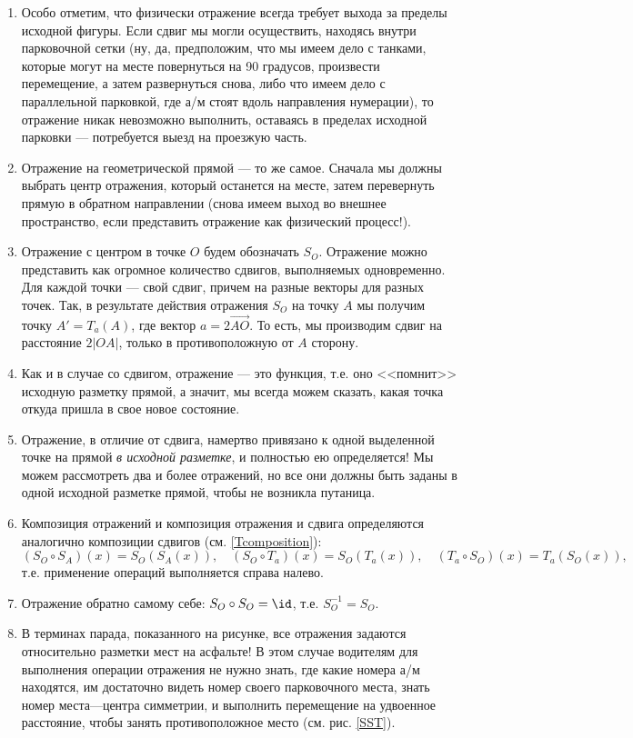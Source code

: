 \begin{enumerate}
\item Особо отметим, что физически отражение всегда требует выхода за пределы исходной фигуры. Если сдвиг мы могли осуществить, находясь внутри парковочной сетки (ну, да, предположим, что мы имеем дело с танками, которые могут на месте повернуться на 90 градусов, произвести перемещение, а затем развернуться снова, либо что имеем дело с параллельной парковкой, где а/м стоят вдоль направления нумерации), то отражение никак невозможно выполнить, оставаясь в пределах исходной парковки --- потребуется выезд на проезжую часть.
\item Отражение на геометрической прямой --- то же самое. Сначала мы должны выбрать центр отражения, который останется на месте, затем перевернуть прямую в обратном направлении (снова имеем выход во внешнее пространство, если представить отражение как физический процесс!).
\item Отражение с центром в точке $O$ будем обозначать $S_O$. Отражение можно представить как огромное количество сдвигов, выполняемых одновременно. Для каждой точки --- свой сдвиг, причем на разные векторы для разных точек. Так, в результате действия отражения $S_O$ на точку $A$ мы получим точку $A'=T_a(A)$, где вектор $a=2\vec{AO}$. То есть, мы производим сдвиг на расстояние $2|OA|$, только в противоположную от $A$ сторону.
\item Как и в случае со сдвигом, отражение --- это функция, т.е. оно <<помнит>> исходную разметку прямой, а значит, мы всегда можем сказать, какая точка откуда пришла в свое новое состояние.
\item Отражение, в отличие от сдвига, намертво привязано к одной выделенной точке на прямой \textit{в исходной разметке}, и полностью ею определяется! Мы можем рассмотреть два и более отражений, но все они должны быть заданы в одной исходной разметке прямой, чтобы не возникла путаница.
\item Композиция отражений и композиция отражения и сдвига определяются аналогично композиции сдвигов (см. \eqref{Tcomposition}):
$$
(S_O\circ S_A)(x) = S_O(S_A(x)),\quad (S_O\circ T_a)(x) = S_O(T_a(x)),\quad (T_a\circ S_O)(x) = T_a(S_O(x)),
$$
т.е. применение операций выполняется справа налево.
\item Отражение обратно самому себе: $S_O\circ S_O=\id$, т.е. $S_O^{-1}=S_O$.
\item В терминах парада, показанного на рисунке, все отражения задаются относительно разметки мест на асфальте! В этом случае водителям для выполнения операции отражения не нужно знать, где какие номера а/м находятся, им достаточно видеть номер своего парковочного места, знать номер места---центра симметрии, и выполнить перемещение на удвоенное расстояние, чтобы занять противоположное место (см. рис. \ref{SST}).

\end{enumerate}
